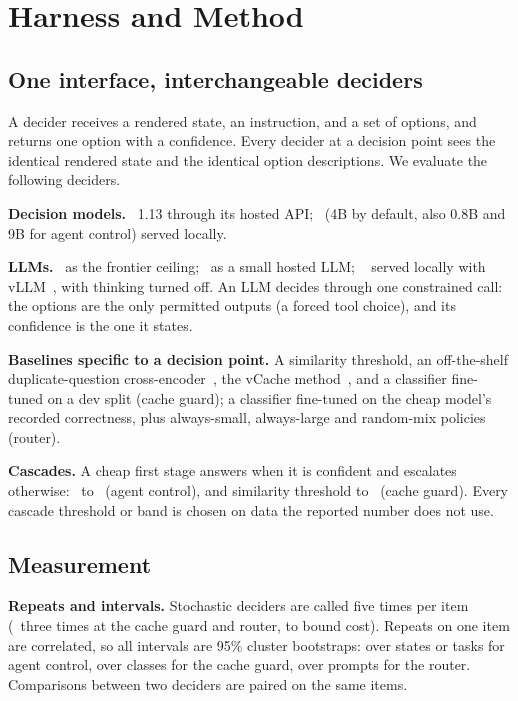 \section{Harness and Method}
\label{sec:method}

\subsection{One interface, interchangeable deciders}

A decider receives a rendered state, an instruction, and a set of options, and returns one option with a confidence.
Every decider at a decision point sees the identical rendered state and the identical option descriptions.
We evaluate the following deciders.

\textbf{Decision models.} \jev\ 1.13 through its hosted API; \kev\ (4B by default, also 0.8B and 9B for agent control) served locally.

\textbf{LLMs.} \gbig\ as the frontier ceiling; \goss\ as a small hosted LLM; \qwen~\cite{yang2025qwen3} served locally with vLLM~\cite{kwon2023vllm}, with thinking turned off.
An LLM decides through one constrained call: the options are the only permitted outputs (a forced tool choice), and its confidence is the one it states.

\textbf{Baselines specific to a decision point.} A similarity threshold, an off-the-shelf duplicate-question cross-encoder~\cite{reimers2019sbert}, the vCache method~\cite{schroeder2025vcache}, and a classifier fine-tuned on a dev split (cache guard); a classifier fine-tuned on the cheap model's recorded correctness, plus always-small, always-large and random-mix policies (router).

\textbf{Cascades.} A cheap first stage answers when it is confident and escalates otherwise: \jev\ to \gbig\ (agent control), and similarity threshold to \jev\ (cache guard).
Every cascade threshold or band is chosen on data the reported number does not use.

\subsection{Measurement}

\textbf{Repeats and intervals.} Stochastic deciders are called five times per item (\gbig\ three times at the cache guard and router, to bound cost).
Repeats on one item are correlated, so all intervals are 95\% cluster bootstraps: over states or tasks for agent control, over classes for the cache guard, over prompts for the router.
Comparisons between two deciders are paired on the same items.

